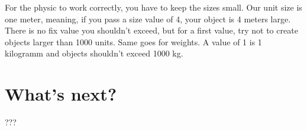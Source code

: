 \documentclass{article}
\begin{document}
For the physic to work correctly, you have to keep the sizes small. Our unit size is one meter, meaning, if you pass a size value of 4, your object is 4 meters large. There is no fix value you shouldn't exceed, but for a first value, try not to create objects larger than 1000 units. Same goes for weights. A value of 1 is 1 kilogramm and objects shouldn't exceed 1000 kg.

\section{What's next?}

???
\end{document}
